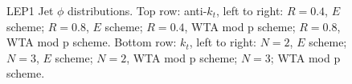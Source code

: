 \begin{figure}[H]
\hfill
{}\hfill
{}\hfill
\caption{LEP1 Jet $\phi$ distributions. Top row: anti-$k_t$, left to right: $R=0.4$, $E$ scheme; $R=0.8$, $E$ scheme; $R=0.4$, WTA mod p scheme; $R=0.8$, WTA mod p scheme. Bottom row: $k_t$, left to right: $N=2$, $E$ scheme; $N=3$, $E$ scheme; $N=2$, WTA mod p scheme; $N=3$; WTA mod p scheme.}  
\end{figure}

